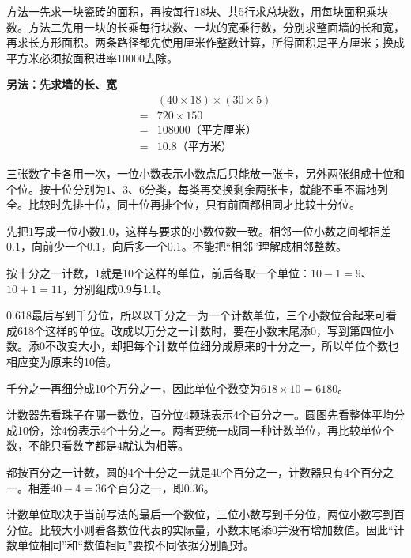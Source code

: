 \documentclass[multi=snippet,border=0pt]{standalone}
\newenvironment{snippet}[3]{\begin{minipage}{#1bp}\color{answerred}\fontsize{#2}{#3}\selectfont\raggedright}{\end{minipage}}
\begin{document}
\begin{snippet}{505}{11.5}{14}方法一先求一块瓷砖的面积，再按每行18块、共5行求总块数，用每块面积乘块数。方法二先用一块的长乘每行块数、一块的宽乘行数，分别求整面墙的长和宽，再求长方形面积。两条路径都先使用厘米作整数计算，所得面积是平方厘米；换成平方米必须按面积进率10000去除。\par \textbf{另法：先求墙的长、宽}\[\begin{aligned}&(40\times18)\times(30\times5)\\={}&720\times150\\={}&108000\text{（平方厘米）}\\={}&10.8\text{（平方米）}\end{aligned}\]\end{snippet}
\begin{snippet}{505}{11.5}{14}三张数字卡各用一次，一位小数表示小数点后只能放一张卡，另外两张组成十位和个位。按十位分别为1、3、6分类，每类再交换剩余两张卡，就能不重不漏地列全。比较时先排十位，同十位再排个位，只有前面都相同才比较十分位。\end{snippet}
\begin{snippet}{505}{11.5}{14}先把1写成一位小数1.0，这样与要求的小数位数一致。相邻一位小数之间都相差0.1，向前少一个0.1，向后多一个0.1。不能把“相邻”理解成相邻整数。\par 按十分之一计数，1就是10个这样的单位，前后各取一个单位：\(10-1=9\)、\(10+1=11\)，分别组成0.9与1.1。\end{snippet}
\begin{snippet}{505}{11.5}{14}0.618最后写到千分位，所以以千分之一为一个计数单位，三个小数位合起来可看成618个这样的单位。改成以万分之一计数时，要在小数末尾添0，写到第四位小数。添0不改变大小，却把每个计数单位细分成原来的十分之一，所以单位个数也相应变为原来的10倍。\par 千分之一再细分成10个万分之一，因此单位个数变为\(618\times10=6180\)。\end{snippet}
\begin{snippet}{505}{11.5}{14}计数器先看珠子在哪一数位，百分位4颗珠表示4个百分之一。圆图先看整体平均分成10份，涂4份表示4个十分之一。两者要统一成同一种计数单位，再比较单位个数，不能只看数字都是4就认为相等。\par 都按百分之一计数，圆的4个十分之一就是40个百分之一，计数器只有4个百分之一。相差\(40-4=36\)个百分之一，即0.36。\end{snippet}
\begin{snippet}{505}{11.5}{14}计数单位取决于当前写法的最后一个数位，三位小数写到千分位，两位小数写到百分位。比较大小则看各数位代表的实际量，小数末尾添0并没有增加数值。因此“计数单位相同”和“数值相同”要按不同依据分别配对。\end{snippet}
\end{document}
